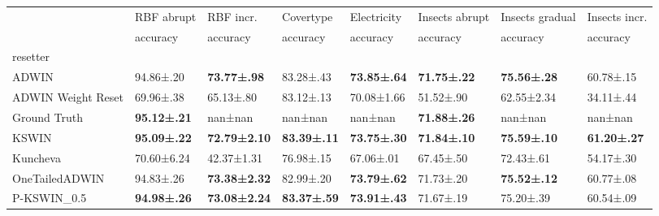 \begin{tabular}{llllllll}
\toprule
 & RBF abrupt & RBF incr. & Covertype & Electricity & Insects abrupt & Insects gradual & Insects incr. \\
 & accuracy & accuracy & accuracy & accuracy & accuracy & accuracy & accuracy \\
resetter &  &  &  &  &  &  &  \\
\midrule
ADWIN & 94.86±.20 & \bfseries 73.77±.98 & 83.28±.43 & \bfseries 73.85±.64 & \bfseries 71.75±.22 & \bfseries 75.56±.28 & 60.78±.15 \\
ADWIN Weight Reset & 69.96±.38 & 65.13±.80 & 83.12±.13 & 70.08±1.66 & 51.52±.90 & 62.55±2.34 & 34.11±.44 \\
Ground Truth & \bfseries 95.12±.21 & nan±nan & nan±nan & nan±nan & \bfseries 71.88±.26 & nan±nan & nan±nan \\
KSWIN & \bfseries 95.09±.22 & \bfseries 72.79±2.10 & \bfseries 83.39±.11 & \bfseries 73.75±.30 & \bfseries 71.84±.10 & \bfseries 75.59±.10 & \bfseries 61.20±.27 \\
Kuncheva & 70.60±6.24 & 42.37±1.31 & 76.98±.15 & 67.06±.01 & 67.45±.50 & 72.43±.61 & 54.17±.30 \\
OneTailedADWIN & 94.83±.26 & \bfseries 73.38±2.32 & 82.99±.20 & \bfseries 73.79±.62 & 71.73±.20 & \bfseries 75.52±.12 & 60.77±.08 \\
P-KSWIN_0.5 & \bfseries 94.98±.26 & \bfseries 73.08±2.24 & \bfseries 83.37±.59 & \bfseries 73.91±.43 & 71.67±.19 & 75.20±.39 & 60.54±.09 \\
\bottomrule
\end{tabular}
